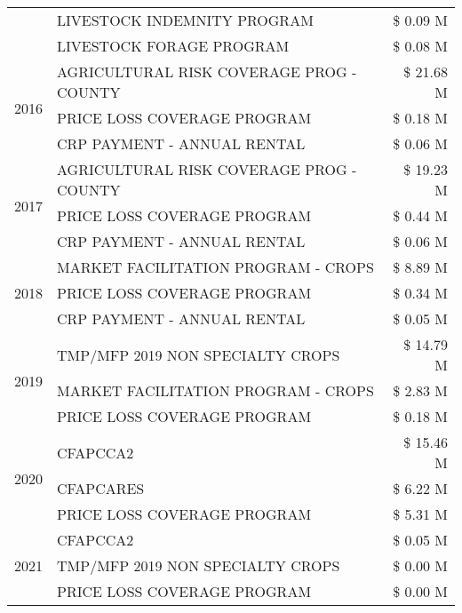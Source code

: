 \begin{tabular}{llr}
 & LIVESTOCK INDEMNITY PROGRAM & \$ 0.09 M \\
 & LIVESTOCK FORAGE PROGRAM & \$ 0.08 M \\
\cline{1-3}
\multirow[t]{3}{*}{2016} & AGRICULTURAL RISK COVERAGE PROG - COUNTY & \$ 21.68 M \\
 & PRICE LOSS COVERAGE PROGRAM & \$ 0.18 M \\
 & CRP PAYMENT - ANNUAL RENTAL & \$ 0.06 M \\
\cline{1-3}
\multirow[t]{3}{*}{2017} & AGRICULTURAL RISK COVERAGE PROG - COUNTY & \$ 19.23 M \\
 & PRICE LOSS COVERAGE PROGRAM & \$ 0.44 M \\
 & CRP PAYMENT - ANNUAL RENTAL & \$ 0.06 M \\
\cline{1-3}
\multirow[t]{3}{*}{2018} & MARKET FACILITATION PROGRAM - CROPS & \$ 8.89 M \\
 & PRICE LOSS COVERAGE PROGRAM & \$ 0.34 M \\
 & CRP PAYMENT - ANNUAL RENTAL & \$ 0.05 M \\
\cline{1-3}
\multirow[t]{3}{*}{2019} & TMP/MFP 2019 NON SPECIALTY CROPS & \$ 14.79 M \\
 & MARKET FACILITATION PROGRAM - CROPS & \$ 2.83 M \\
 & PRICE LOSS COVERAGE PROGRAM & \$ 0.18 M \\
\cline{1-3}
\multirow[t]{3}{*}{2020} & CFAPCCA2 & \$ 15.46 M \\
 & CFAPCARES & \$ 6.22 M \\
 & PRICE LOSS COVERAGE PROGRAM & \$ 5.31 M \\
\cline{1-3}
\multirow[t]{3}{*}{2021} & CFAPCCA2 & \$ 0.05 M \\
 & TMP/MFP 2019 NON SPECIALTY CROPS & \$ 0.00 M \\
 & PRICE LOSS COVERAGE PROGRAM & \$ 0.00 M \\
\cline{1-3}
\bottomrule
\end{tabular}
